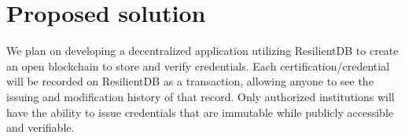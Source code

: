 \section{Proposed solution}

We plan on developing a decentralized application utilizing ResilientDB to create an open blockchain
to store and verify credentials. Each certification/credential will be recorded on ResilientDB as a
transaction, allowing anyone to see the issuing and modification history of that record. Only
authorized institutions will have the ability to issue credentials that are immutable while publicly
accessible and verifiable.
